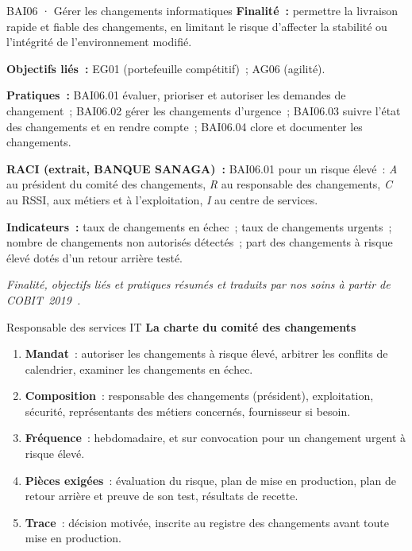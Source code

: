 \begin{boxobjet}{BAI06 · Gérer les changements informatiques}
\textbf{Finalité~:} permettre la livraison rapide et fiable des
changements, en limitant le risque d'affecter la stabilité ou l'intégrité
de l'environnement modifié.

\textbf{Objectifs liés~:} EG01 (portefeuille compétitif)~; AG06 (agilité).

\textbf{Pratiques~:} BAI06.01 évaluer, prioriser et autoriser les demandes
de changement~; BAI06.02 gérer les changements d'urgence~; BAI06.03 suivre
l'état des changements et en rendre compte~; BAI06.04 clore et documenter
les changements.

\textbf{RACI (extrait, BANQUE SANAGA)~:} BAI06.01 pour un risque élevé~:
\emph{A} au président du comité des changements, \emph{R} au responsable
des changements, \emph{C} au RSSI, aux métiers et à l'exploitation,
\emph{I} au centre de services.

\textbf{Indicateurs~:} taux de changements en échec~; taux de changements
urgents~; nombre de changements non autorisés détectés~; part des
changements à risque élevé dotés d'un retour arrière testé.
\end{boxobjet}
{\small\itshape Finalité, objectifs liés et pratiques résumés et traduits
par nos soins à partir de COBIT~2019~\cite{isaca2018cobitobjectifs}.}

\begin{boxmetier}{Responsable des services IT}
\textbf{La charte du comité des changements}
\begin{enumerate}
    \item \textbf{Mandat}~: autoriser les changements à risque élevé,
          arbitrer les conflits de calendrier, examiner les changements en
          échec.
    \item \textbf{Composition}~: responsable des changements (président),
          exploitation, sécurité, représentants des métiers concernés,
          fournisseur si besoin.
    \item \textbf{Fréquence}~: hebdomadaire, et sur convocation pour un
          changement urgent à risque élevé.
    \item \textbf{Pièces exigées}~: évaluation du risque, plan de mise en
          production, plan de retour arrière et preuve de son test,
          résultats de recette.
    \item \textbf{Trace}~: décision motivée, inscrite au registre des
          changements avant toute mise en production.
\end{enumerate}
\end{boxmetier}


